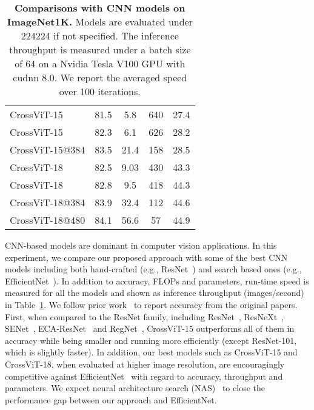 \documentclass[10pt,twocolumn,letterpaper]{article}
\def\ours{CrossViT\xspace}
\newcommand{\myparagraph}[1]{\vspace{1mm} \noindent {\textbf{#1}}}
\begin{document}
\begin{table}[t]
\begin{adjustbox}{max width=\linewidth}
\begin{tabular}{l|c|c|c|c}
\midrule
            \ours-15& 81.5 & 5.8 & 640 & 27.4 \\
            \ours-15 & 82.3 & 6.1 & 626 & 28.2 \\ 
            \ours-15@384 & 83.5 & 21.4 & 158 & 28.5 \\ 
\ours-18& 82.5& 9.03 & 430 & 43.3 \\ 
            \ours-18 & 82.8 & 9.5 & 418 & 44.3 \\ 
\ours-18@384& 83.9 & 32.4 & 112 & 44.6 \\ 
            \ours-18@480& 84.1 & 56.6 & 57 & 44.9 \\
\bottomrule
    \end{tabular}
    \end{adjustbox}
\caption{\textbf{Comparisons with CNN models on ImageNet1K.} Models are evaluated under 224224 if not specified. 
    The inference throughput is measured under a batch size of 64 on a Nvidia Tesla V100 GPU with cudnn 8.0. We report the averaged speed over 100 iterations.}
    \label{table:compare_cnn}
\end{table}





 
\myparagraph{Comparisons with CNN-based Models.}
CNN-based models are dominant in computer vision applications. In this experiment, we compare our proposed approach with some of the best CNN models including both hand-crafted (e.g., ResNet~\cite{ResNet_He_2016_CVPR}) and search based ones (e.g., EfficientNet~\cite{efficientnet_pmlr_tan_19}).
In addition to accuracy, FLOPs and parameters, run-time speed is measured for all the models and shown as inference throughput (images/second) in Table~\ref{table:compare_cnn}.
We follow prior work~\cite{DeiT_touvron2020} to report accuracy from the original papers.
First, when compared to the ResNet family, including ResNet~\cite{ResNet_He_2016_CVPR}, ResNeXt~\cite{ResNeXt_Xie_2017_CVPR}, SENet~\cite{SENet_Hu_2018}, ECA-ResNet~\cite{ECA_wang2020} and RegNet~\cite{RegNet_Radosavovic_2020_CVPR}, \ours-15 outperforms all of them in accuracy while being smaller and running more efficiently (except ResNet-101, which is slightly faster).
In addition, our best models such as \ours-15 and \ours-18, when evaluated at higher image resolution, are encouragingly competitive against EfficientNet~\cite{efficientnet_pmlr_tan_19} with regard to accuracy, throughput and parameters. We expect neural architecture search (NAS)~\cite{Nasnet_Zoph_2018_CVPR} to close the performance gap between our approach and EfficientNet. 
\end{document}
